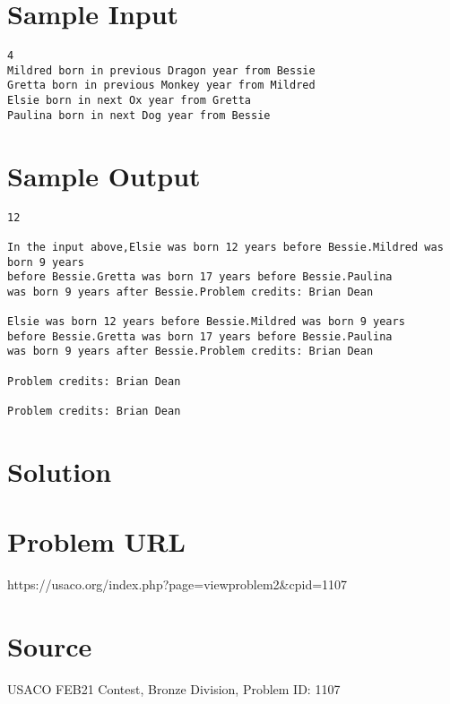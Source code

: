 \documentclass[12pt]{article}
\begin{document}
\section*{Sample Input}
\begin{verbatim}
4
Mildred born in previous Dragon year from Bessie
Gretta born in previous Monkey year from Mildred
Elsie born in next Ox year from Gretta
Paulina born in next Dog year from Bessie
\end{verbatim}

\section*{Sample Output}
\begin{verbatim}
12

In the input above,Elsie was born 12 years before Bessie.Mildred was born 9 years
before Bessie.Gretta was born 17 years before Bessie.Paulina
was born 9 years after Bessie.Problem credits: Brian Dean

Elsie was born 12 years before Bessie.Mildred was born 9 years
before Bessie.Gretta was born 17 years before Bessie.Paulina
was born 9 years after Bessie.Problem credits: Brian Dean

Problem credits: Brian Dean

Problem credits: Brian Dean
\end{verbatim}

\section*{Solution}


\section*{Problem URL}
https://usaco.org/index.php?page=viewproblem2&cpid=1107

\section*{Source}
USACO FEB21 Contest, Bronze Division, Problem ID: 1107
\end{document}

